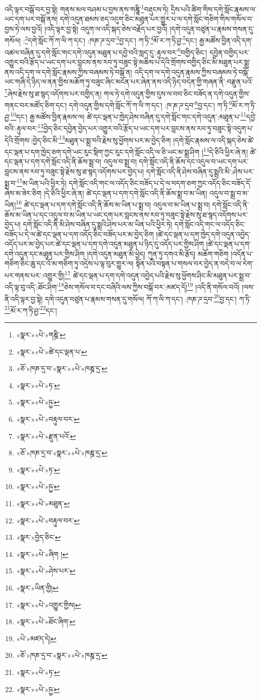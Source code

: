 འདི་ལྟར་བསྒོ་བར་བྱ་སྟེ། གནས་མལ་བཤམ་པ་བྱས་ནས་གཎྜཱི་\footnote{«སྣར་»«པེ་»གཎྜི་}བརྡུངས་ཏེ། དྲིས་པའི་ཚིག་གིས་དགེ་སློང་རྣམས་ལ་ཡང་དག་པར་བསྒོ་ནས། དགེ་འདུན་ཐམས་ཅད་འདུག་ཅིང་མཐུན་པར་གྱུར་པ་ལ་དགེ་སློང་གཅིག་གིས་གསོལ་བ་བྱས་ཏེ་ལས་བྱའོ། །འདི་ལྟར་བྱ་སྟེ། འདུག་ལ་འདི་སྐད་ཅེས་བརྗོད་པར་བྱའོ། །དགེ་འདུན་བཙུན་པ་རྣམས་གསན་དུ་གསོལ། :\footnote{«སྣར་»«པེ་»ཚེ་དང་ལྡན་པ་}དགེ་སློང་ཀོ་ཀ་ལི་ཀ་དང་། :ཁཎ་ཌ་དྲབ་\footnote{«ཅོ་»ཁཎ་དྲ་བ་«སྣར་»«པེ་»ཁཎྜ་དྲ་}བྱ་དང་། ཀ་ཏི་\footnote{«སྣར་»«པེ་»ཏ་}མོ་ར་ཀ་ཏི་ཤྱ་\footnote{«སྣར་»«པེ་»ཥྱ་}དང་། རྒྱ་མཚོས་བྱིན་འདི་དག་འཚལ་བཞིན་དུ་དགེ་སློང་གང་དགེ་འདུན་མཐུན་པ་དབྱེ་བའི་སླད་དུ་:རྟུལ་བར་\footnote{«སྣར་»«པེ་»བརྟུལ་བར་}བགྱིད་ཅིང་། དབྱེན་བགྱིད་པར་འགྱུར་བའི་རྩོད་པ་ཡང་དག་པར་བླངས་ནས་རབ་ཏུ་བཟུང་སྟེ་མཆིས་པ་དེའི་གྲོགས་བགྱིད་ཅིང་མི་མཐུན་པར་སྨྲ་ནས་འདི་དག་ལ་དགེ་སློང་རྣམས་ཀྱིས་བཞམས་ཏེ་བསྒོ་ན། འདི་དག་ལ་དགེ་འདུན་རྣམས་ཀྱིས་བཞམས་ཏེ་བསྒོ་ཡང་གཞི་དེ་ཉིད་ལ་ནན་གྱིས་མཆོག་ཏུ་བཟུང་ཞིང་མངོན་པར་ཞེན་ནས་འདི་ཉིད་བདེན་གྱི་གཞན་ནི་:བརྫུན་པའོ་\footnote{«སྣར་»«པེ་»རྫུན་པའོ་}ཞེས་རྗེས་སུ་ཐ་སྙད་འདོགས་པར་བགྱིད་ན། གལ་ཏེ་དགེ་འདུན་གྱིས་དུས་ལ་བབ་ཅིང་བཟོད་ན་དགེ་འདུན་གྱིས་གནང་བར་མཛོད་ཅིག་དང་། དགེ་འདུན་གྱིས་དགེ་སློང་ཀོ་ཀ་ལི་ཀ་དང་། :ཁ་ཎ་ཌ་དྲབ་\footnote{«ཅོ་»ཁཎ་དྲ་བ་«སྣར་»«པེ་»ཁཎྜ་དྲ་}བྱ་དང་། ཀ་ཏི་\footnote{«སྣར་»«པེ་»ཏ་}མོ་ར་ཀ་ཏི་ཤྱ་\footnote{«སྣར་»«པེ་»ཥྱ་}དང་། རྒྱ་མཚོས་བྱིན་རྣམས་ལ། ཚེ་དང་ལྡན་པ་ཁྱེད་ཤེས་བཞིན་དུ་དགེ་སློང་གང་དགེ་འདུན་:མཐུན་པ་\footnote{«སྣར་»«པེ་»མཐུན་}དབྱེ་བའི་:རྟུལ་བར་\footnote{«སྣར་»«པེ་»བརྟུལ་བར་}བྱེད་ཅིང་དབྱེན་བྱེད་པར་འགྱུར་བའི་རྩོད་པ་ཡང་དག་པར་བླངས་ནས་རབ་ཏུ་བཟུང་སྟེ་འདུག་པ་དེའི་གྲོགས་:བྱེད་ཅིང་མི་\footnote{«སྣར་»བྱེད་ཅིང་}མཐུན་པ་སྨྲ་བའི་རྗེས་སུ་ཕྱོགས་པར་མ་བྱེད་ཅིག །དགེ་སློང་རྣམས་ལ་འདི་སྐད་ཅེས་ཚེ་དང་ལྡན་པ་དག་ཁྱེད་ཅག་དགེ་ཡང་རུང་སྡིག་ཀྱང་རུང་དགེ་སློང་འདི་ལ་ཅི་ཡང་མ་སྨྲ་ཤིག །\footnote{«སྣར་»«པེ་»ཞིག །}དེ་ཅིའི་ཕྱིར་ཞེ་ན། ཚེ་དང་ལྡན་པ་དག་དགེ་སློང་འདི་ནི་ཆོས་སྨྲ་བ། འདུལ་བ་སྨྲ་བ། དགེ་སློང་འདི་ནི་ཆོས་དང་འདུལ་བ་ཡང་དག་པར་བླངས་ནས་རབ་ཏུ་བཟུང་སྟེ་རྗེས་སུ་ཐ་སྙད་འདོགས་པར་བྱེད་པ། དགེ་སློང་འདི་ནི་ཤེས་བཞིན་དུ་སྨྲའི་མི་:ཤེས་པར་སྨྲ་བ་\footnote{«སྣར་»«པེ་»ཤེས་པར་}མ་ཡིན་པའི་ཕྱིར་ཏེ། དགེ་སློང་འདི་གང་ལ་འདོད་ཅིང་བཟོད་པ་དེ་ལ་བདག་ཅག་ཀྱང་འདོད་ཅིང་བཟོད་དོ་ཞེས་མ་ཟེར་ཅིག །དེ་ཅིའི་ཕྱིར་ཞེ་ན། ཚེ་དང་ལྡན་པ་དག་དགེ་སློང་འདི་ནི་ཆོས་སྨྲ་བ་མ་ཡིན། འདུལ་བ་སྨྲ་བ་མ་ཡིན།\footnote{«སྣར་»ཡིན་གྱི།} ཚེ་དང་ལྡན་པ་དག་དགེ་སློང་འདི་ནི་ཆོས་མ་ཡིན་པ་སྨྲ་བ། འདུལ་བ་མ་ཡིན་པ་སྨྲ་བ། དགེ་སློང་འདི་ནི་ཆོས་མ་ཡིན་པ་དང་འདུལ་བ་མ་ཡིན་པ་ཡང་དག་པར་བླངས་ནས་རབ་ཏུ་བཟུང་སྟེ་རྗེས་སུ་ཐ་སྙད་འདོགས་པར་བྱེད་པ། དགེ་སློང་འདི་ནི་མི་ཤེས་བཞིན་དུ་སྨྲའི་ཤེས་པར་མ་ཡིན་པའི་ཕྱིར་ཏེ། དགེ་སློང་འདི་གང་ལ་འདོད་ཅིང་བཟོད་པ་དེ་ལ་ཚེ་དང་ལྡན་པ་དག་འདོད་ཅིང་བཟོད་པར་མ་བྱེད་ཅིག །ཚེ་དང་ལྡན་པ་དག་ཁྱེད་དགེ་འདུན་འབྱེད་འདོད་པར་མ་བྱེད་པར་ཚེ་དང་ལྡན་པ་དག་དགེ་འདུན་མཐུན་པ་ཉིད་དུ་འདོད་པར་གྱིས་ཤིག །ཚེ་དང་ལྡན་པ་དག་དགེ་འདུན་དང་མཐུན་པར་གྱིས་ཤིག །དགེ་འདུན་མཐུན་མི་ཕྱེད། ཀུན་ཏུ་དགའ་མི་རྩོད། མཆོག་གཅིག །འདོན་པ་གཅིག་ཅིང་ཆུ་དང་འོ་མ་གཅིག་ཏུ་འདྲེས་པ་ལྟ་བུར་གྱུར་ལ། སྟོན་པའི་བསྟན་པ་གསལ་བར་བྱེད་ན་བདེ་བ་ལ་རེག་པར་གནས་པར་:འགྱུར་གྱི།\footnote{«སྣར་»«པེ་»འགྱུར་གྱིས།} ཚེ་དང་ལྡན་པ་དག་དགེ་འདུན་འབྱེད་པའི་རྗེས་སུ་ཕྱོགས་ཤིང་མི་མཐུན་པར་སྨྲ་བ་འདི་ལྟ་བུ་འདི་:ཐོང་ཤིག་\footnote{«སྣར་»«པེ་»ཐོང་ཞིག་}ཅེས་གསོལ་བ་དང་བཞིའི་ལས་ཀྱིས་བསྒོ་བར་:མཛད་དོ།\footnote{«པེ་»མཛད་དེ།} །འདི་ནི་གསོལ་བའོ། །ལས་ནི་འདི་ལྟར་བྱ་སྟེ། དགེ་འདུན་བཙུན་པ་རྣམས་གསན་དུ་གསོལ། ཀོ་ཀ་ལི་ཀ་དང་། :ཁཎ་ཌ་དྲབ་\footnote{«ཅོ་»ཁཎ་དྲ་བ་«སྣར་»«པེ་»ཁཎྜ་དྲ་}བྱ་དང་། ཀ་ཏི་\footnote{«སྣར་»«པེ་»ཏ་}མོ་ར་ཀ་ཏི་ཤྱ་\footnote{«སྣར་»«པེ་»ཥྱ་}དང་། 